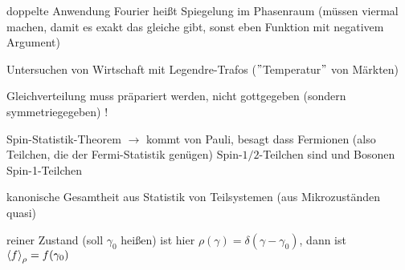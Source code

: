 \documentclass[../KlassMech_main.tex]{subfiles}
\begin{document}
doppelte Anwendung Fourier heißt Spiegelung im Phasenraum (müssen viermal machen, damit es exakt das gleiche gibt, sonst eben Funktion mit negativem Argument)

Untersuchen von Wirtschaft mit Legendre-Trafos ($"$Temperatur$"$ von Märkten)

Gleichverteilung muss präpariert werden, nicht gottgegeben (sondern symmetriegegeben) !

Spin-Statistik-Theorem $\rightarrow$ kommt von Pauli, besagt dass Fermionen (also Teilchen, die der Fermi-Statistik genügen) Spin-$1/2$-Teilchen sind und Bosonen Spin-1-Teilchen


kanonische Gesamtheit aus Statistik von Teilsystemen (aus Mikrozuständen quasi)

reiner Zustand (soll $\gamma_0$ heißen) ist hier $\rho(\gamma) = \delta(\gamma - \gamma_0)$, dann ist $\expval{f}_\rho = f(\gamma_0)$
\end{document}
